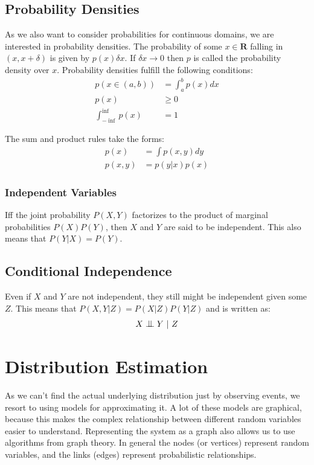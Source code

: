 \documentclass{article}
\newcommand{\bigCI}{\mathrel{\text{\scalebox{1.07}{$\perp\mkern-10mu\perp$}}}}
\begin{document}
\subsection{Probability Densities}
As we also want to consider probabilities for continuous domains, we are interested in probability densities.
The probability of some $x \in \mathbf{R}$ falling in $(x, x+\delta)$ is given by $p(x)\delta x$.
If $\delta x \rightarrow 0$ then $p$ is called the probability density over $x$.
Probability densities fulfill the following conditions:
\begin{align}
	p(x \in (a,b)) &= \int_a^b p(x) dx\\
	p(x) &\ge 0\\
	\int_{- \inf}^{\inf} p(x) &= 1
\end{align}

The sum and product rules take the forms:
\begin{align}
	p(x) &= \int p(x,y) dy\\
	p(x, y) &= p(y|x) p(x)
\end{align}

\subsubsection{Independent Variables}
Iff the joint probability $P(X,Y)$ factorizes to the product of marginal probabilities $P(X)P(Y)$, then $X$ and $Y$ are said to be independent.
This also means that $P(Y|X) = P(Y)$.

\subsection{Conditional Independence}
Even if $X$ and $Y$ are not independent, they still might be independent given some $Z$.
This means that $P(X,Y | Z) = P(X|Z) P(Y|Z)$ and is written as:
\begin{equation}
	X \bigCI Y \ |\ Z
\end{equation}

\section{Distribution Estimation}
As we can't find the actual underlying distribution just by observing events, we resort to using models for approximating it.
A lot of these models are graphical, because this makes the complex relationship between different random variables easier to understand.
Representing the system as a graph also allows us to use algorithms from graph theory.
In general the nodes (or vertices) represent random variables, and the links (edges) represent probabilistic relationships.
\end{document}
